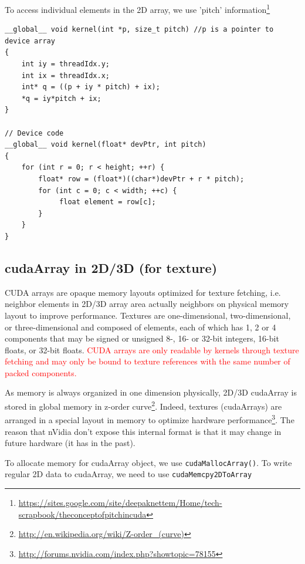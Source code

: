 To access individual elements in the 2D array, we use 'pitch'
information\footnote{\url{https://sites.google.com/site/deepaknettem/Home/tech-scrapbook/theconceptofpitchincuda}}
\begin{lstlisting}
__global__ void kernel(int *p, size_t pitch) //p is a pointer to device array
{
    int iy = threadIdx.y;
    int ix = threadIdx.x;
    int* q = ((p + iy * pitch) + ix);
    *q = iy*pitch + ix;
}

// Device code
__global__ void kernel(float* devPtr, int pitch)
{
    for (int r = 0; r < height; ++r) {
        float* row = (float*)((char*)devPtr + r * pitch);
        for (int c = 0; c < width; ++c) {
             float element = row[c];
        }
    }
}
\end{lstlisting}



\subsection{cudaArray in 2D/3D (for texture)}
\label{sec:cudaArray}

CUDA arrays are opaque memory layouts optimized for texture
fetching, i.e. neighbor elements in 2D/3D array area actually neighbors on
physical memory layout to improve performance. Textures are one-dimensional,
two-dimensional, or three-dimensional and composed of elements, each of which has 1, 2 or 4 components that may be signed or unsigned 8-, 16- or 32-bit
integers, 16-bit floats, or 32-bit floats.
\textcolor{red}{CUDA arrays are only readable by kernels through
  texture fetching and may only be bound to texture references with
  the same number of packed components.}


As memory is always organized in one dimension physically, 2D/3D cudaArray is
stored in global memory in z-order curve\footnote{\url{http://en.wikipedia.org/wiki/Z-order_(curve)}}. Indeed,
textures (cudaArrays) are arranged in a special layout in memory to optimize hardware performance\footnote{\url{http://forums.nvidia.com/index.php?showtopic=78155}}.
The reason that nVidia don't expose this internal format is that it may change in future hardware (it has in the past).

To allocate memory for cudaArray object, we use \verb!cudaMallocArray()!. To
write regular 2D data to cudaArray, we need to use \verb!cudaMemcpy2DToArray!



